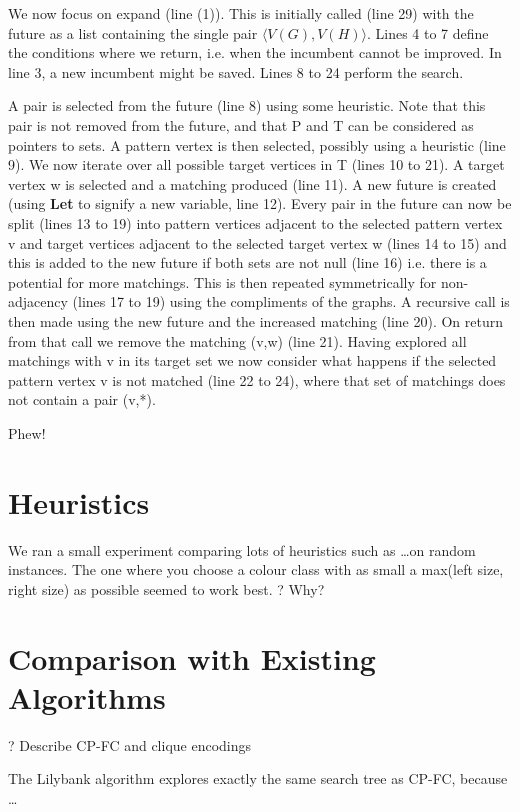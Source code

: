 \documentclass[letterpaper]{article}
\begin{document}
We now focus on expand (line (1)). This is initially called (line 29) with the future as a list containing the single pair $\langle V(G),V(H) \rangle$. Lines 4 to 7 define the conditions 
where we return, i.e. when the incumbent cannot be improved. In line 3, a new incumbent might be saved. Lines 8 to 24 perform the search.

A pair is selected from the future (line 8) using some heuristic. Note that this pair is not removed from the future, and that P and T can be considered as pointers to sets. A pattern vertex is then selected, possibly using a heuristic (line 9). We now iterate over all possible target vertices in T (lines 10 to 21). A target vertex w is selected and a matching produced (line 11). A new future is created (using {\bf Let} to signify a new variable, line 12). Every pair in the future can now be split (lines 13 to 19) into pattern vertices adjacent to the selected pattern vertex v and target vertices adjacent to the selected target vertex w (lines 14 to 15) and this is added to the new future if both sets are not null (line 16) i.e. there is a potential for more matchings. This is then repeated symmetrically for non-adjacency (lines 17 to 19) using the compliments of the graphs.
A recursive call is then made using the new future and the increased matching (line 20). On return from that call we remove the matching (v,w) (line 21). Having explored all matchings with v in its target set we now consider what happens if the selected pattern vertex v is not matched (line 22 to 24), where that set of matchings does not contain a pair (v,*).

\bigskip
\noindent
Phew!

\section{Heuristics}

We ran a small experiment comparing lots of heuristics such as \dots on random
instances. The one where you choose a colour class with as small a max(left size,
right size) as possible seemed to work best. ? Why?

\section{Comparison with Existing Algorithms}

? Describe CP-FC and clique encodings

The Lilybank algorithm explores exactly the same search tree as CP-FC, because \dots
\end{document}
